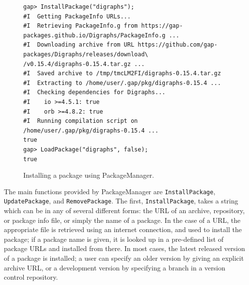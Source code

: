 \begin{figure}[!ht]
    \centering
    {\tiny
\begin{verbatim}
gap> InstallPackage("digraphs");
#I  Getting PackageInfo URLs...
#I  Retrieving PackageInfo.g from https://gap-packages.github.io/Digraphs/PackageInfo.g ...
#I  Downloading archive from URL https://github.com/gap-packages/Digraphs/releases/download\
/v0.15.4/digraphs-0.15.4.tar.gz ...
#I  Saved archive to /tmp/tmcLM2FI/digraphs-0.15.4.tar.gz
#I  Extracting to /home/user/.gap/pkg/digraphs-0.15.4 ...
#I  Checking dependencies for Digraphs...
#I    io >=4.5.1: true
#I    orb >=4.8.2: true
#I  Running compilation script on /home/user/.gap/pkg/digraphs-0.15.4 ...
true
gap> LoadPackage("digraphs", false);
true
\end{verbatim}
    }
    \caption{Installing a package using {\sf PackageManager}.}
    \label{fig:pkgman-sample}
\end{figure}

The main functions provided by {\sf PackageManager} are \texttt{InstallPackage},
\texttt{UpdatePackage}, and \texttt{RemovePackage}.  The first,
\texttt{InstallPackage}, takes a string which can be in any of several different
forms: the URL of an archive, repository, or package info file, or simply the
name of a package.  In the case of a URL, the appropriate file is retrieved
using an internet connection, and used to install the package; if a package name
is given, it is looked up in a pre-defined list of package URLs and installed
from there.  In most cases, the latest released version of a package is
installed; a user can specify an older version by giving an explicit archive
URL, or a development version by specifying a branch in a
version control repository.  %

